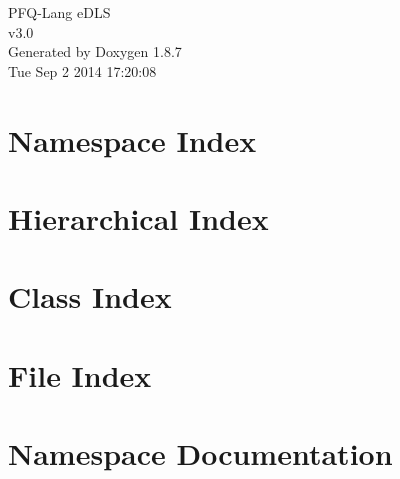 \documentclass[twoside]{book}
\newcommand{\+}{\discretionary{\mbox{\scriptsize$\hookleftarrow$}}{}{}}
\newcommand{\clearemptydoublepage}{%
  \newpage{\pagestyle{empty}\cleardoublepage}%
}
\begin{document}
\hypersetup{pageanchor=false,
             bookmarks=true,
             bookmarksnumbered=true,
             pdfencoding=unicode
            }
\begin{titlepage}
\vspace*{7cm}
\begin{center}%
{\Large P\+F\+Q-\/\+Lang e\+D\+L\+S \\[1ex]\large v3.\+0 }\\
\vspace*{1cm}
{\large Generated by Doxygen 1.8.7}\\
\vspace*{0.5cm}
{\small Tue Sep 2 2014 17:20:08}\\
\end{center}
\end{titlepage}
\clearemptydoublepage
\tableofcontents
\clearemptydoublepage
{}
\hypersetup{pageanchor=true}

\chapter{Namespace Index}

\chapter{Hierarchical Index}

\chapter{Class Index}

\chapter{File Index}

\chapter{Namespace Documentation}





\end{document}
